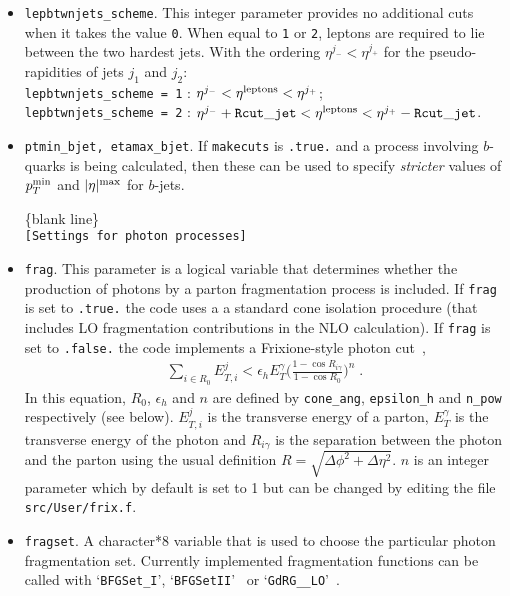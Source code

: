 \documentclass[12pt]{article}
\begin{document}
\begin{itemize}
\item {\tt lepbtwnjets\_scheme}. This integer parameter provides no
additional cuts when it takes the value {\tt 0}. When equal to
{\tt 1} or {\tt 2}, leptons are required to lie between the two
hardest jets. With the ordering $\eta^{j_-} < \eta^{j_+}$ for the
pseudo-rapidities of jets $j_1$ and $j_2$: \\
{\tt lepbtwnjets\_scheme = 1} : 
 $\eta^{j_-} < \eta^{\rm leptons} < \eta^{j_+}$; \\
{\tt lepbtwnjets\_scheme = 2} :
 $\eta^{j_-}+{\tt Rcut\_jet} < \eta^{\rm leptons} < \eta^{j_+}-{\tt Rcut\_jet}$.

\item {\tt ptmin\_bjet,  etamax\_bjet}. If {\tt makecuts} is {\tt .true.}
and a process involving $b$-quarks is being calculated, then these can
be used to specify {\em stricter} values of $p_T^{\rm min}$
and $|\eta|^{\rm max}$ for $b$-jets.

\begin{center}
\{blank line\} \\
{\tt [Settings for photon processes] }
\end{center}
\item {\tt frag}. This parameter is a logical variable that determines whether the production of photons by a parton 
fragmentation process is included. If {\tt frag} is set to {\tt .true.} the code uses a a standard cone isolation
procedure (that includes LO fragmentation contributions in the NLO calculation).
If {\tt frag} is set to {\tt .false.} the code implements
a Frixione-style photon cut~\cite{Frixione:1998jh},
\begin{eqnarray}
\sum_{i \in R_0} E_{T,i}^j  < \epsilon_h E_{T}^{\gamma} \bigg(\frac{1-\cos{R_{i\gamma}}}{1-\cos{R_0}}\bigg)^{n} \;.
\label{frixeq}
\end{eqnarray}
In this equation, $R_0$, $\epsilon_h$ and $n$ are defined by {\tt cone\_ang}, {\tt epsilon\_h} 
and {\tt n\_pow}  respectively (see below).
$E_{T,i}^{j}$ is the transverse energy of a parton, $E_{T}^\gamma$ is the
transverse energy of the photon and $R_{i\gamma}$ is the separation between the photon and the parton using the usual definition 
$R=\sqrt{\Delta\phi^2+\Delta\eta^2}$. $n$ is an integer parameter which by default is set to 1 but can be changed by editing the 
file {\tt src/User/frix.f}. 

\item {\tt fragset}. A character*8 variable that is used to choose the particular photon fragmentation set.
Currently implemented fragmentation functions can be called with `{\tt BFGSet\_I}', `{\tt BFGSetII}'~\cite{Bourhis:1997yu}
or `{\tt GdRG\_\_LO}'~\cite{GehrmannDeRidder:1998ba}.  


\end{itemize}
\end{document}
